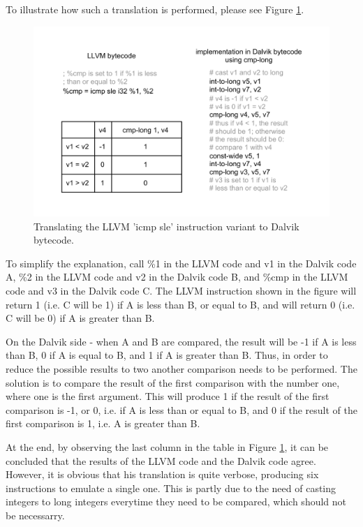 \documentclass[parskip]{cs4rep}
\begin{document}
To illustrate how such a translation is performed, please see Figure \ref{fig:cmpsle}.

\begin{figure}[h!]
    \centering
        \includegraphics[width=1.0\textwidth]{cmpsle}
    \caption{Translating the LLVM 'icmp sle' instruction variant to Dalvik bytecode.}
    \label{fig:cmpsle}
\end{figure}

To simplify the explanation, call \%1 in the LLVM code and v1 in the Dalvik code A, \%2 in the LLVM code and v2 in the Dalvik code B, and \%cmp in the LLVM code and v3 in the Dalvik code C. The LLVM instruction shown in the figure will return 1 (i.e. C will be 1) if A is less than B, or equal to B, and will return 0 (i.e. C will be 0) if A is greater than B.

On the Dalvik side - when A and B are compared, the result will be -1 if A is less than B, 0 if A is equal to B, and 1 if A is greater than B. Thus, in order to reduce the possible results to two another comparison needs to be performed. The solution is to compare the result of the first comparison with the number one, where one is the first argument. This will produce 1 if the result of the first comparison is -1, or 0, i.e. if A is less than or equal to B, and 0 if the result of the first comparison is 1, i.e. A is greater than B.

At the end, by observing the last column in the table in Figure \ref{fig:cmpsle}, it can be concluded that the results of the LLVM code and the Dalvik code agree. However, it is obvious that his translation is quite verbose, producing six instructions to emulate a single one. This is partly due to the need of casting integers to long integers everytime they need to be compared, which should not be necessarry.
\end{document}
